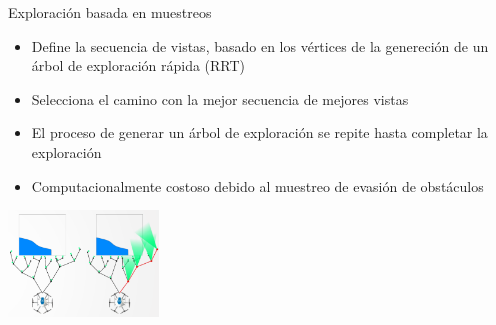 \documentclass[
  24pt, %
  aspectratio=169, %
]{beamer}
\begin{document}
\begin{frame}{Exploración basada en muestreos}

  \begin{itemize}
  \item Define la secuencia de vistas, basado en los vértices de la genereción de un árbol de exploración rápida (RRT)
  \item Selecciona el camino con la mejor secuencia de mejores vistas
  \item El proceso de generar un árbol de exploración se repite hasta completar la exploración
  \item Computacionalmente costoso debido al muestreo de evasión de obstáculos
  \end{itemize}

  \bigskip %
  \centering
  \includegraphics[width=4cm]{nbvprrt}\\
  \cite{nbvprrt}
  
\end{frame}


    
    
\end{document}
